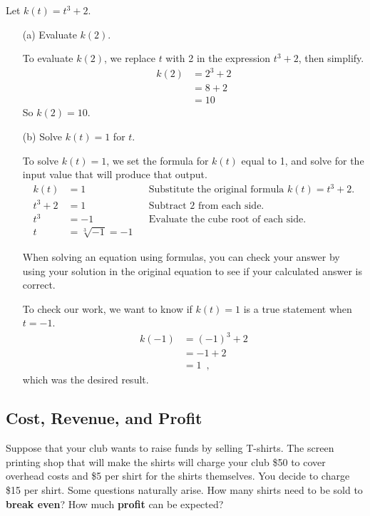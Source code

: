\begin{example}
Let $k(t) = t^3 + 2$.
    \begin{itemize}
        \item[(a)] Evaluate $k(2)$.

        \begin{solution} To evaluate $k(2)$, we replace $t$ with 2 in the expression $t^3+2$, then simplify.
        \begin{align*}
            k(2) &= 2^3 + 2 \\
            &= 8 + 2 \\
            &= 10
        \end{align*}
        So $k(2) = 10$.
        \end{solution}
        \item[(b)] Solve $k(t) = 1$ for $t$.

        \begin{solution} To solve $k(t) = 1$, we set the formula for $k(t)$ equal to 1, and solve for the input value that will produce that output.
        \begin{align*}
            k(t)    &=  1 & &\mbox{Substitute the original formula } k(t) = t^3 + 2.\\
            t^3 + 2 &=  1 & &\mbox{Subtract 2 from each side}. \\
            t^3     &= -1 & &\mbox{Evaluate the cube root of each side.}\\
            t       &= \sqrt[3]{-1} = -1& &
        \end{align*}

When solving an equation using formulas, you can check your answer by using your solution in the original equation to see if your calculated answer is correct.

To check our work, we want to know if $k(t)=1$ is a true statement when $t=-1$.
    \begin{align*}
        k(-1) &= (-1)^3 + 2 \\
              &= -1 + 2 \\
              &= 1 \enspace ,
          \end{align*}
which was the desired result.
\end{solution}
    \end{itemize}
\end{example}


\subsection{Cost, Revenue, and Profit}
\label{ssec:cost}
Suppose that your club wants to raise funds by selling T-shirts. The screen printing shop that will make the shirts will charge your club \$50 to cover overhead costs and \$5 per shirt for the shirts themselves. You decide to charge \$15 per shirt. Some questions naturally arise. How many shirts need to be sold to {\bf break even}? How much {\bf profit} can be expected?


